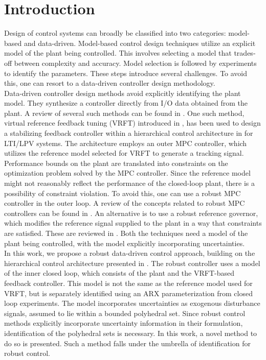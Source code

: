 \documentclass[letterpaper, 10 pt, conference]{ieeeconf}  %
\begin{document}
\section{Introduction}
Design of control systems can broadly be classified into two categories: model-based and data-driven. Model-based control design techniques utilize an explicit model of the plant being controlled. This involves selecting a model that trades-off between complexity and accuracy. Model selection is followed by experiments to identify the parameters. These steps introduce several challenges. To avoid this, one can resort to a data-driven controller design methodology. \\
\indent
Data-driven controller design methods avoid explicitly identifying the plant model. They synthesize a controller directly from I/O data obtained from the plant. A review of several such methods can be found in \cite{HOU20133}. One such method, virtual reference feedback tuning (VRFT) introduced in \cite{CAMPI20021337}, has been used to design a stabilizing feedback controller within a hierarchical control architecture in \cite{7932940} for LTI/LPV systems. The architecture employs an outer MPC controller, which utilizes the reference model selected for VRFT to generate a tracking signal. Performance bounds on the plant are translated into constraints on the optimization problem solved by the MPC controller. Since the reference model might not reasonably reflect the performance of the closed-loop plant, there is a possibility of constraint violation.
To avoid this, one can use a robust MPC controller in the outer loop. A review of the concepts related to robust MPC controllers can be found in \cite{10.1007/BFb0109870}. An alternative is to use a robust reference governor, which modifies the reference signal supplied to the plant in a way that constraints are satisfied. These are reviewed in \cite{GARONE2017306}. Both the techniques need a model of the plant being controlled, with the model explicitly incorporating uncertainties.
\\ \indent
In this work, we propose a robust data-driven control approach, building on the hierarchical control architecture presented in \cite{7932940}. The robust controller uses a model of the inner closed loop, which consists of the plant and the VRFT-based feedback controller. This model is not the same as the reference model used for VRFT, but is separately identified using an ARX parameterization from closed loop experiments. 
 The model incorporates uncertainties as exogenous disturbance signals, assumed to lie within a bounded polyhedral set. Since robust control methods explicitly incorporate uncertainty information in their formulation, identification of the polyhedral sets is necessary. In this work, a novel method to do so is presented. Such a method falls under the umbrella of identification for robust control.
\end{document}

